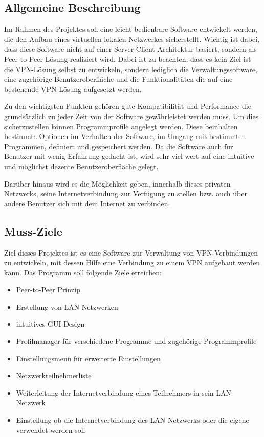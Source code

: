 \documentclass[a4paper,12pt]{scrreprt}
\begin{document}
		\subsection{Allgemeine Beschreibung}
		
		Im Rahmen des Projektes soll eine leicht bedienbare Software entwickelt werden, die den Aufbau eines virtuellen lokalen Netzwerkes sicherstellt. Wichtig ist dabei, dass diese Software nicht auf einer Server-Client Architektur basiert, sondern als Peer-to-Peer Lösung realisiert wird. Dabei ist zu beachten, dass es kein Ziel ist die VPN-Lösung selbst zu entwickeln, sondern lediglich die Verwaltungssoftware, eine zugehörige Benutzeroberfläche und die Funktionalitäten die auf eine bestehende VPN-Lösung aufgesetzt werden.
		
		Zu den wichtigsten Punkten gehören gute Kompatibilität und Performance die grundsätzlich zu jeder Zeit von der Software gewährleistet werden muss. Um dies sicherzustellen können Programmprofile angelegt werden. Diese beinhalten bestimmte Optionen im Verhalten der Software, im Umgang mit bestimmten Programmen, definiert und gespeichert werden. Da die Software auch für Benutzer mit wenig Erfahrung gedacht ist, wird sehr viel wert auf eine intuitive und möglichst dezente Benutzeroberfläche gelegt.
		
		Darüber hinaus wird es die Möglichkeit geben, innerhalb dieses privaten Netzwerks, seine Internetverbindung zur Verfügung zu stellen bzw. auch über andere Benutzer sich mit dem Internet zu verbinden. 
		
			
		\subsection{Muss-Ziele}
		Ziel dieses Projektes ist es eine Software zur Verwaltung von VPN-Verbindungen zu entwickeln, mit dessen Hilfe eine Verbindung zu einem VPN aufgebaut werden kann. Das Programm soll folgende Ziele erreichen:\\
		\begin{itemize}
		\item Peer-to-Peer Prinzip
		\item Erstellung von LAN-Netzwerken
		\item intuitives GUI-Design
		\item Profilmanager für verschiedene Programme und zugehörige Programmprofile
		\item Einstellungsmenü für erweiterte Einstellungen
		\item Netzwerkteilnehmerliste
		\item Weiterleitung der Internetverbindung eines Teilnehmers in sein LAN-Netzwerk
		\item Einstellung ob die Internetverbindung des LAN-Netzwerks oder die eigene verwendet werden soll
		
		\end{itemize}
		
\end{document}

